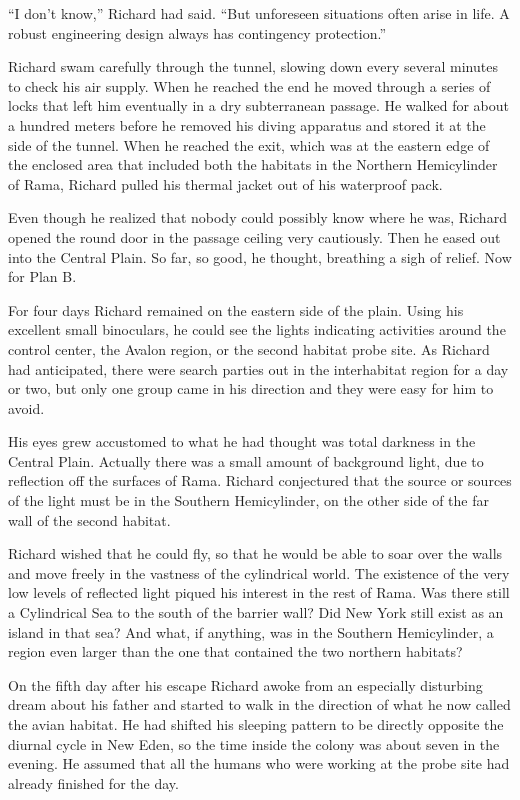 \documentclass[]{article}
\begin{document}
{“I don’t know,” Richard had said. “But unforeseen situations often arise in life. A robust engineering design always has contingency protection.”

Richard swam carefully through the tunnel, slowing down every several minutes to check his air supply. When he reached the end he moved through a series of locks that left him eventually in a dry subterranean passage. He walked for about a hundred meters before he removed his diving apparatus and stored it at the side of the tunnel. When he reached the exit, which was at the eastern edge of the enclosed area that included both the habitats in the Northern Hemicylinder of Rama, Richard pulled his thermal jacket out of his waterproof pack.

Even though he realized that nobody could possibly know where he was, Richard opened the round door in the passage ceiling very cautiously. Then he eased out into the Central Plain. So far, so good, he thought, breathing a sigh of relief. Now for Plan B.

For four days Richard remained on the eastern side of the plain. Using his excellent small binoculars, he could see the lights indicating activities around the control center, the Avalon region, or the second habitat probe site. As Richard had anticipated, there were search parties out in the interhabitat region for a day or two, but only one group came in his direction and they were easy for him to avoid.

His eyes grew accustomed to what he had thought was total darkness in the Central Plain. Actually there was a small amount of background light, due to reflection off the surfaces of Rama. Richard conjectured that the source or sources of the light must be in the Southern Hemicylinder, on the other side of the far wall of the second habitat.

Richard wished that he could fly, so that he would be able to soar over the walls and move freely in the vastness of the cylindrical world. The existence of the very low levels of reflected light piqued his interest in the rest of Rama. Was there still a Cylindrical Sea to the south of the barrier wall? Did New York still exist as an island in that sea? And what, if anything, was in the Southern Hemicylinder, a region even larger than the one that contained the two northern habitats?

On the fifth day after his escape Richard awoke from an especially disturbing dream about his father and started to walk in the direction of what he now called the avian habitat. He had shifted his sleeping pattern to be directly opposite the diurnal cycle in New Eden, so the time inside the colony was about seven in the evening. He assumed that all the humans who were working at the probe site had already finished for the day.

}
\end{document}
